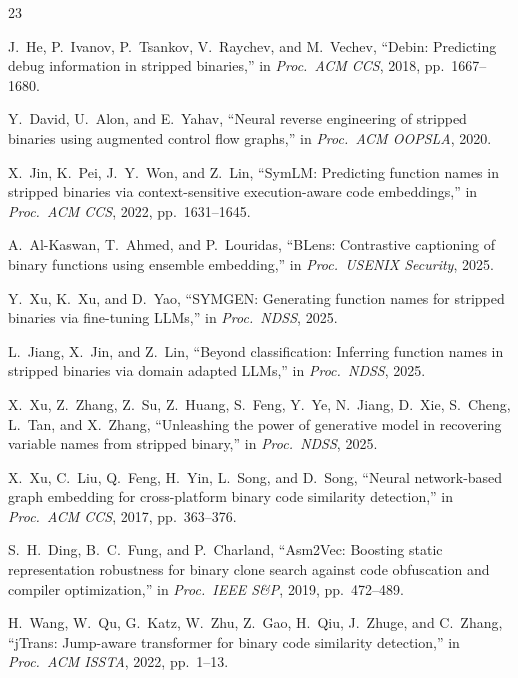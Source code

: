 \documentclass[sigconf,nonacm]{acmart}
\begin{document}

\begin{thebibliography}{23}

J.~He, P.~Ivanov, P.~Tsankov, V.~Raychev, and M.~Vechev, ``Debin: Predicting debug information in stripped binaries,'' in \emph{Proc.\ ACM CCS}, 2018, pp.~1667--1680.

Y.~David, U.~Alon, and E.~Yahav, ``Neural reverse engineering of stripped binaries using augmented control flow graphs,'' in \emph{Proc.\ ACM OOPSLA}, 2020.

X.~Jin, K.~Pei, J.~Y.~Won, and Z.~Lin, ``SymLM: Predicting function names in stripped binaries via context-sensitive execution-aware code embeddings,'' in \emph{Proc.\ ACM CCS}, 2022, pp.~1631--1645.

A.~Al-Kaswan, T.~Ahmed, and P.~Louridas, ``BLens: Contrastive captioning of binary functions using ensemble embedding,'' in \emph{Proc.\ USENIX Security}, 2025.

Y.~Xu, K.~Xu, and D.~Yao, ``SYMGEN: Generating function names for stripped binaries via fine-tuning LLMs,'' in \emph{Proc.\ NDSS}, 2025.

L.~Jiang, X.~Jin, and Z.~Lin, ``Beyond classification: Inferring function names in stripped binaries via domain adapted LLMs,'' in \emph{Proc.\ NDSS}, 2025.

X.~Xu, Z.~Zhang, Z.~Su, Z.~Huang, S.~Feng, Y.~Ye, N.~Jiang, D.~Xie, S.~Cheng, L.~Tan, and X.~Zhang, ``Unleashing the power of generative model in recovering variable names from stripped binary,'' in \emph{Proc.\ NDSS}, 2025.

X.~Xu, C.~Liu, Q.~Feng, H.~Yin, L.~Song, and D.~Song, ``Neural network-based graph embedding for cross-platform binary code similarity detection,'' in \emph{Proc.\ ACM CCS}, 2017, pp.~363--376.

S.~H.~Ding, B.~C.~Fung, and P.~Charland, ``Asm2Vec: Boosting static representation robustness for binary clone search against code obfuscation and compiler optimization,'' in \emph{Proc.\ IEEE S\&P}, 2019, pp.~472--489.

H.~Wang, W.~Qu, G.~Katz, W.~Zhu, Z.~Gao, H.~Qiu, J.~Zhuge, and C.~Zhang, ``jTrans: Jump-aware transformer for binary code similarity detection,'' in \emph{Proc.\ ACM ISSTA}, 2022, pp.~1--13.


\end{thebibliography}
\end{document}
